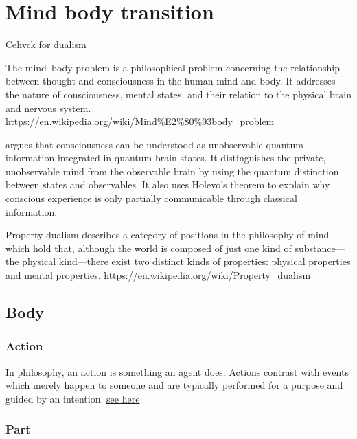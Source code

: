 \documentclass{book}
\newcommand{\seehere}[1]{\href{#1}{see here}}
\providecommand{\seehere}[1]{\href{#1}{see here}}
\begin{document}
\section{Mind body transition}


Cehvck for dualism
    
    The mind–body problem is a philosophical problem concerning the relationship between thought and consciousness in the human mind and body. It addresses the nature of consciousness, mental states, and their relation to the physical brain and nervous system.
    \url{https://en.wikipedia.org/wiki/Mind%E2%80%93body_problem}
    
    \cite{georgiev-2020-quantum-information-theoretic-approach-to-the-mind-brain-problem}  argues that consciousness can be understood as unobservable quantum information integrated in quantum brain states. It distinguishes the private, unobservable mind from the observable brain by using the quantum distinction between states and observables. It also uses Holevo’s theorem to explain why conscious experience is only partially communicable through classical information.


Property dualism describes a category of positions in the philosophy of mind which hold that, although the world is composed of just one kind of substance—the physical kind—there exist two distinct kinds of properties: physical properties and mental properties.
    \url{https://en.wikipedia.org/wiki/Property_dualism}

\subsection{Body}

\subsubsection{Action}


In philosophy, an action is something an agent does. Actions contrast with events which merely happen to someone and are typically performed for a purpose and guided by an intention. \seehere{https://en.wikipedia.org/wiki/Action_(philosophy)}

\subsubsection{Part}
\end{document}
